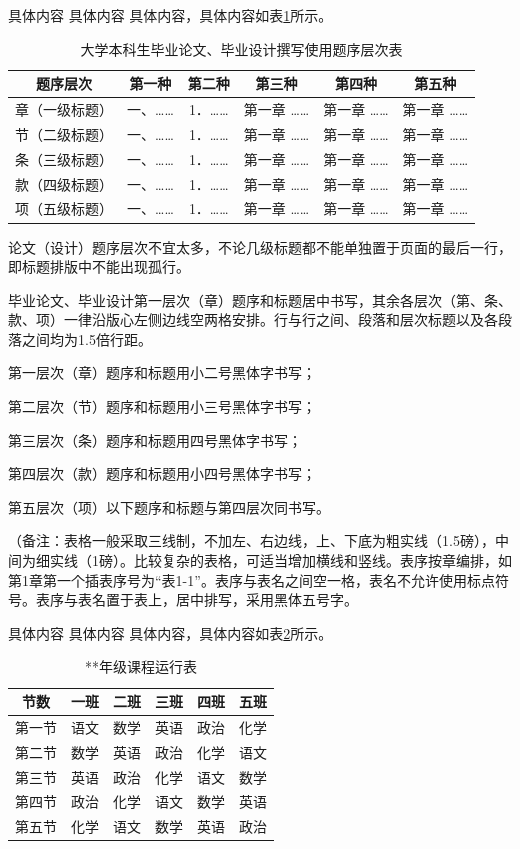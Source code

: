 \documentclass{sicnuthesis}
\begin{document}
具体内容 具体内容 具体内容，具体内容如表\ref{table1}所示。

\begin{table}
  \begin{tabular}{ c c c c c c }
    \hline
    题序层次        & 第一种 & 第二种 & 第三种    & 第四种    & 第五种    \\ \hline
    章（一级标题）  & 一、…… & 1．……  & 第一章 …… & 第一章 …… &	第一章 …… \\
    节（二级标题）  & 一、…… & 1．……  & 第一章 …… & 第一章 …… &	第一章 …… \\
    条（三级标题）  & 一、…… & 1．……  & 第一章 …… & 第一章 …… &	第一章 …… \\
    款（四级标题）  & 一、…… & 1．……  & 第一章 …… & 第一章 …… &	第一章 …… \\
    项（五级标题）  & 一、…… & 1．……  & 第一章 …… & 第一章 …… &	第一章 …… \\ \hline
  \end{tabular}
  \caption{大学本科生毕业论文、毕业设计撰写使用题序层次表}
  \label{table1}
\end{table}

论文（设计）题序层次不宜太多，不论几级标题都不能单独置于页面的最后一行，即标题排版中不能出现孤行。

毕业论文、毕业设计第一层次（章）题序和标题居中书写，其余各层次（第、条、款、项）一律沿版心左侧边线空两格安排。行与行之间、段落和层次标题以及各段落之间均为1.5倍行距。

第一层次（章）题序和标题用小二号黑体字书写；

第二层次（节）题序和标题用小三号黑体字书写；

第三层次（条）题序和标题用四号黑体字书写；

第四层次（款）题序和标题用小四号黑体字书写；

第五层次（项）以下题序和标题与第四层次同书写。

（备注：表格一般采取三线制，不加左、右边线，上、下底为粗实线（1.5磅），中间为细实线（1磅）。比较复杂的表格，可适当增加横线和竖线。表序按章编排，如第1章第一个插表序号为“表1-1”。表序与表名之间空一格，表名不允许使用标点符号。表序与表名置于表上，居中排写，采用黑体五号字。

具体内容 具体内容 具体内容，具体内容如表\ref{table2}所示。

\begin{table}
  \begin{tabular}{ c c c c c c }
    \hline
    节数   & 一班 & 二班 & 三班 & 四班 & 五班 \\ \hline
    第一节 & 语文 & 数学 & 英语 & 政治 & 化学 \\
    第二节 & 数学 & 英语 & 政治 & 化学 & 语文 \\
    第三节 & 英语 & 政治 & 化学 & 语文 & 数学 \\
    第四节 & 政治 & 化学 & 语文 & 数学 & 英语 \\
    第五节 & 化学 & 语文 & 数学 & 英语 & 政治 \\ \hline
  \end{tabular}
  \caption{**年级课程运行表}
  \label{table2}
\end{table}
\end{document}
